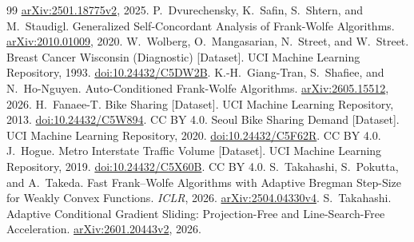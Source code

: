 \documentclass[11pt]{article}
\begin{document}
\begin{thebibliography}{99}
\href{https://arxiv.org/abs/2501.18775v2}{arXiv:2501.18775v2}, 2025.
 P.~Dvurechensky, K.~Safin, S.~Shtern, and M.~Staudigl.
Generalized Self-Concordant Analysis of Frank-Wolfe Algorithms.
\href{https://arxiv.org/abs/2010.01009}{arXiv:2010.01009}, 2020.
 W.~Wolberg, O.~Mangasarian, N.~Street, and W.~Street.
Breast Cancer Wisconsin (Diagnostic) [Dataset]. UCI Machine Learning Repository, 1993.
\href{https://doi.org/10.24432/C5DW2B}{doi:10.24432/C5DW2B}.
 K.-H.~Giang-Tran, S.~Shafiee, and N.~Ho-Nguyen.
Auto-Conditioned Frank-Wolfe Algorithms.
\href{https://arxiv.org/abs/2605.15512}{arXiv:2605.15512}, 2026.
 H.~Fanaee-T. Bike Sharing [Dataset]. UCI Machine Learning Repository, 2013.
\href{https://doi.org/10.24432/C5W894}{doi:10.24432/C5W894}. CC BY 4.0.
 Seoul Bike Sharing Demand [Dataset].
UCI Machine Learning Repository, 2020.
\href{https://doi.org/10.24432/C5F62R}{doi:10.24432/C5F62R}. CC BY 4.0.
 J.~Hogue. Metro Interstate Traffic Volume [Dataset].
UCI Machine Learning Repository, 2019.
\href{https://doi.org/10.24432/C5X60B}{doi:10.24432/C5X60B}. CC BY 4.0.
 S.~Takahashi, S.~Pokutta, and A.~Takeda.
Fast Frank--Wolfe Algorithms with Adaptive Bregman Step-Size for Weakly Convex Functions.
\emph{ICLR}, 2026.
\href{https://arxiv.org/abs/2504.04330v4}{arXiv:2504.04330v4}.
 S.~Takahashi.
Adaptive Conditional Gradient Sliding: Projection-Free and Line-Search-Free Acceleration.
\href{https://arxiv.org/abs/2601.20443v2}{arXiv:2601.20443v2}, 2026.
\end{thebibliography}
\end{document}
